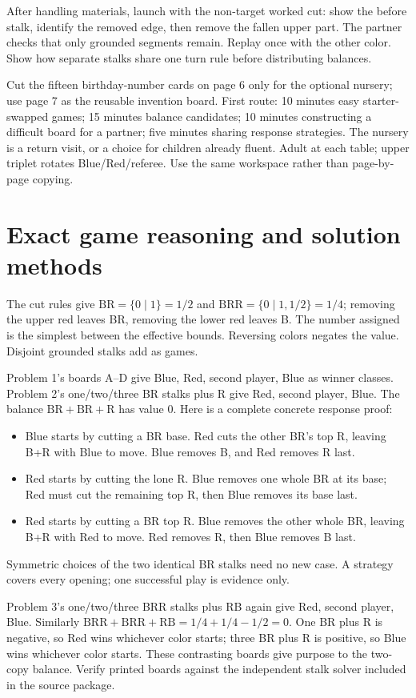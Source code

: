 \documentclass[11pt,letterpaper]{article}
\begin{document}
After handling materials, launch with the non-target worked cut: show the before stalk, identify the removed edge, then remove the fallen upper part. The partner checks that only grounded segments remain. Replay once with the other color. Show how separate stalks share one turn rule before distributing balances.

Cut the fifteen birthday-number cards on page 6 only for the optional nursery; use page 7 as the reusable invention board. First route: 10 minutes easy starter-swapped games; 15 minutes balance candidates; 10 minutes constructing a difficult board for a partner; five minutes sharing response strategies. The nursery is a return visit, or a choice for children already fluent. Adult at each table; upper triplet rotates Blue/Red/referee. Use the same workspace rather than page-by-page copying.
\newpage
\section*{Exact game reasoning and solution methods}
The cut rules give $\mathrm{BR}=\{0\mid1\}=1/2$ and $\mathrm{BRR}=\{0\mid1,1/2\}=1/4$; removing the upper red leaves BR, removing the lower red leaves B. The number assigned is the simplest between the effective bounds. Reversing colors negates the value. Disjoint grounded stalks add as games.

Problem 1's boards A--D give Blue, Red, second player, Blue as winner classes. Problem 2's one/two/three BR stalks plus R give Red, second player, Blue. The balance $\mathrm{BR}+\mathrm{BR}+\mathrm{R}$ has value 0. Here is a complete concrete response proof:
\begin{itemize}
\item Blue starts by cutting a BR base. Red cuts the other BR's top R, leaving B+R with Blue to move. Blue removes B, and Red removes R last.
\item Red starts by cutting the lone R. Blue removes one whole BR at its base; Red must cut the remaining top R, then Blue removes its base last.
\item Red starts by cutting a BR top R. Blue removes the other whole BR, leaving B+R with Red to move. Red removes R, then Blue removes B last.
\end{itemize}
Symmetric choices of the two identical BR stalks need no new case. A strategy covers every opening; one successful play is evidence only.

Problem 3's one/two/three BRR stalks plus RB again give Red, second player, Blue. Similarly $\mathrm{BRR}+\mathrm{BRR}+\mathrm{RB}=1/4+1/4-1/2=0$. One BR plus R is negative, so Red wins whichever color starts; three BR plus R is positive, so Blue wins whichever color starts. These contrasting boards give purpose to the two-copy balance. Verify printed boards against the independent stalk solver included in the source package.
\end{document}
